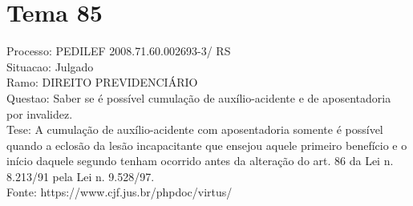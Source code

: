 \documentclass[12pt]{article}
\begin{document}
\section*{Tema 85}
Processo: PEDILEF 2008.71.60.002693-3/ RS\\
Situacao: Julgado\\
Ramo: DIREITO PREVIDENCIÁRIO\\
Questao: Saber se é possível cumulação de auxílio-acidente e de aposentadoria por invalidez.\\
Tese: A cumulação de auxílio-acidente com aposentadoria somente é possível quando a eclosão da lesão incapacitante que ensejou aquele primeiro benefício e o início daquele segundo tenham ocorrido antes da alteração do art. 86 da Lei n. 8.213/91 pela Lei n. 9.528/97.\\
Fonte: https://www.cjf.jus.br/phpdoc/virtus/
\end{document}
